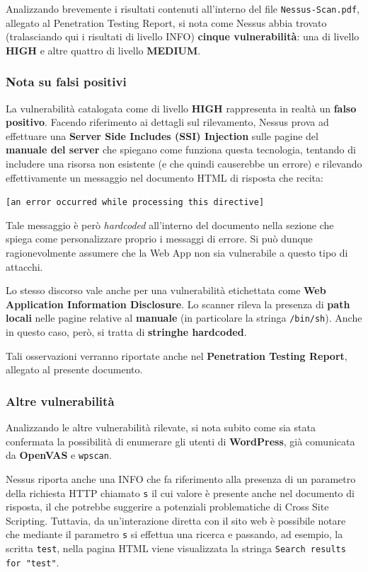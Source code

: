 \documentclass[a4paper, 12pt, oneside]{article}
\begin{document}
Analizzando brevemente i risultati contenuti all'interno del file \texttt{Nessus-Scan.pdf}, allegato al Penetration Testing Report, si nota come Nessus abbia trovato (tralasciando qui i risultati di livello INFO) \textbf{cinque vulnerabilità}: una di livello \textbf{HIGH} e altre quattro di livello \textbf{MEDIUM}.

\subsubsection{Nota su falsi positivi}
La vulnerabilità catalogata come di livello \textbf{HIGH} rappresenta in realtà un \textbf{falso positivo}. Facendo riferimento ai dettagli sul rilevamento, Nessus prova ad effettuare una \textbf{Server Side Includes (SSI) Injection} sulle pagine del \textbf{manuale del server} che spiegano come funziona questa tecnologia, tentando di includere una risorsa non esistente (e che quindi causerebbe un errore) e rilevando effettivamente un messaggio nel documento HTML di risposta che recita:

\begin{center}
    \texttt{[an error occurred while processing this directive]}
\end{center}

Tale messaggio è però \textit{hardcoded} all'interno del documento nella sezione che spiega come personalizzare proprio i messaggi di errore. Si può dunque ragionevolmente assumere che la Web App non sia vulnerabile a questo tipo di attacchi.

Lo stesso discorso vale anche per una vulnerabilità etichettata come \textbf{Web Application Information Disclosure}. Lo scanner rileva la presenza di \textbf{path locali} nelle pagine relative al \textbf{manuale} (in particolare la stringa \texttt{/bin/sh}). Anche in questo caso, però, si tratta di \textbf{stringhe hardcoded}.

Tali osservazioni verranno riportate anche nel \textbf{Penetration Testing Report}, allegato al presente documento.

\subsubsection{Altre vulnerabilità}
Analizzando le altre vulnerabilità rilevate, si nota subito come sia stata confermata la possibilità di enumerare gli utenti di \textbf{WordPress}, già comunicata da \textbf{OpenVAS} e \texttt{wpscan}.

Nessus riporta anche una INFO che fa riferimento alla presenza di un parametro della richiesta HTTP chiamato \texttt{s} il cui valore è presente anche nel documento di risposta, il che potrebbe suggerire a potenziali problematiche di Cross Site Scripting. Tuttavia, da un'interazione diretta con il sito web è possibile notare che mediante il parametro \texttt{s} si effettua una ricerca e passando, ad esempio, la scritta \texttt{test}, nella pagina HTML viene visualizzata la stringa \texttt{Search results for "test"}. 
\end{document}
